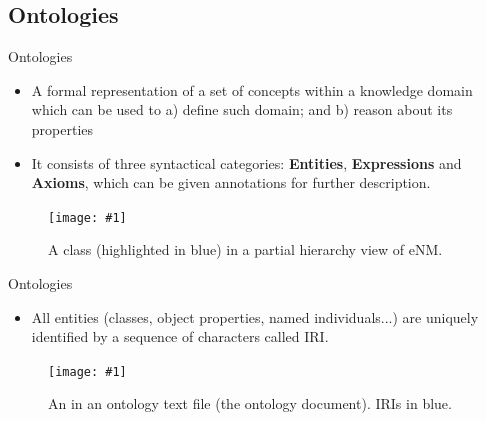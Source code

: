 \documentclass[english, xcolor=dvipsnames, aspectratio=169]{beamer}
\newcommand{\includefigurelarger}[2]
{
    \begin{figure}[h]
    \caption{#2}
    \centering
    \texttt{[image: \#1]}
    \end{figure}
}
\newcommand{\includefiguresmaller}[2]
{
    \begin{figure}[h]
    \caption{#2}
    \centering
    \texttt{[image: \#1]}
    \end{figure}
}
\newcommand{\subsectiontitle}{}
\begin{document}
% 
\renewcommand{\subsectiontitle}{Ontologies}
\subsection{\subsectiontitle}
\begin{frame}{\subsectiontitle}
 			\begin{itemize}
\item A formal representation of a set of concepts within a knowledge domain which can be used to a) define such domain; and b) reason about its properties \citet{source}  
\item It consists of three syntactical categories: \textbf{Entities}, \textbf{Expressions} and \textbf{Axioms}, which can be given annotations for further description.
    		\end{itemize}

                \includefiguresmaller{classhierarchy.png}{A class (highlighted in blue) in a partial hierarchy view of eNM.}

\end{frame}




% 


\begin{frame}{\subsectiontitle}
\begin{itemize}
\item All entities (classes, object properties, named individuals...) are uniquely identified by a sequence of characters called IRI.

\end{itemize}

 \includefigurelarger{class.pdf}{An  in an ontology text file (the ontology document). IRIs in blue.}
\end{frame}

%
\end{document}
